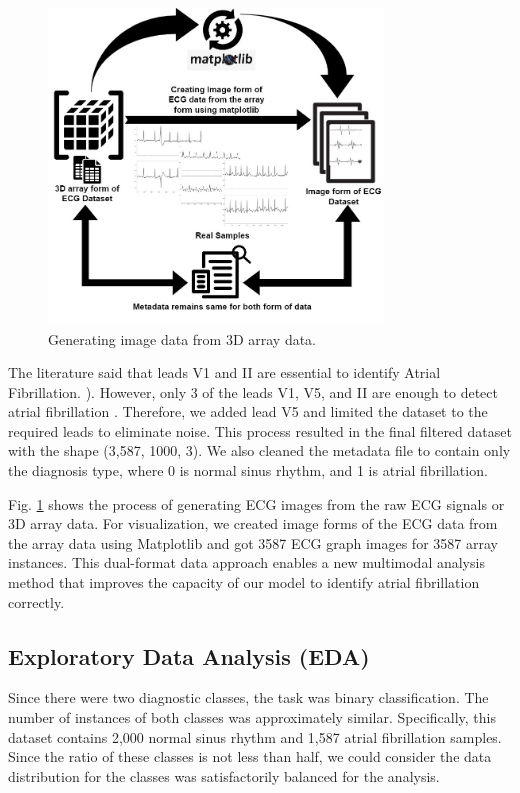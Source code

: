 \documentclass[conference]{IEEEtran}
\begin{document}
\begin{figure}[htbp]
\centerline{\includegraphics[width=3.5in]{5-Generating Image Data.jpg}}
\caption{Generating image data from 3D array data.}
\label{fig-5:Generating Image}
\end{figure}

The literature \cite{ramkumar2018atrial} said that leads V1 and II are essential to identify Atrial Fibrillation. ). However, only 3 of the leads V1, V5, and II are enough to detect atrial fibrillation \cite{kristensen2016use}. Therefore, we added lead V5 and limited the dataset to the required leads to eliminate noise. This process resulted in the final filtered dataset with the shape (3,587, 1000, 3). We also cleaned the metadata file to contain only the diagnosis type, where 0 is normal sinus rhythm, and 1 is atrial fibrillation.

Fig. \ref{fig-5:Generating Image} shows the process of generating ECG images from the raw ECG signals or 3D array data. For visualization, we created image forms of the ECG data from the array data using Matplotlib and got 3587 ECG graph images for 3587 array instances. This dual-format data approach enables a new multimodal analysis method that improves the capacity of our model to identify atrial fibrillation correctly.

\subsection{Exploratory Data Analysis (EDA)}

Since there were two diagnostic classes, the task was binary classification. The number of instances of both classes was approximately similar. Specifically, this dataset contains 2,000 normal sinus rhythm and 1,587 atrial fibrillation samples. Since the ratio of these classes is not less than half, we could consider the data distribution for the classes was satisfactorily balanced for the analysis.
\end{document}
